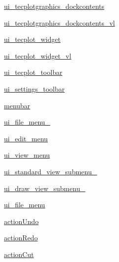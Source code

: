 \begin{DoxyCompactItemize}
\item 
\hyperlink{classoutput__viewer_u_i_1_1_ui___main_window_a833a8408dc99f9eedbb331e8e360bdf5}{ui\+\_\+tecplotgraphics\+\_\+dockcontents}
\item 
\hyperlink{classoutput__viewer_u_i_1_1_ui___main_window_a9937dfdabe6438f3bfec3ba0c6976557}{ui\+\_\+tecplotgraphics\+\_\+dockcontents\+\_\+vl}
\item 
\hyperlink{classoutput__viewer_u_i_1_1_ui___main_window_a7e3ee3296fa5786336d90635c2442045}{ui\+\_\+tecplot\+\_\+widget}
\item 
\hyperlink{classoutput__viewer_u_i_1_1_ui___main_window_a617fa074367d63edd758567a5d67b398}{ui\+\_\+tecplot\+\_\+widget\+\_\+vl}
\item 
\hyperlink{classoutput__viewer_u_i_1_1_ui___main_window_afbd7bdb7c0f0d9d24bad52a80454d101}{ui\+\_\+tecplot\+\_\+toolbar}
\item 
\hyperlink{classoutput__viewer_u_i_1_1_ui___main_window_a34720910fa97b9e65de72cbee6a12803}{ui\+\_\+settings\+\_\+toolbar}
\item 
\hyperlink{classoutput__viewer_u_i_1_1_ui___main_window_a265e28ccad6c1cd4a94a22965fe6c536}{menubar}
\item 
\hyperlink{classoutput__viewer_u_i_1_1_ui___main_window_ad42c5a1028285e160bfb9eb048cd245b}{ui\+\_\+file\+\_\+menu\+\_\+}
\item 
\hyperlink{classoutput__viewer_u_i_1_1_ui___main_window_a791ff2e9d4693638b8e5220f53f1b8d2}{ui\+\_\+edit\+\_\+menu}
\item 
\hyperlink{classoutput__viewer_u_i_1_1_ui___main_window_aaf13351c59caceedfc932c46217b4cda}{ui\+\_\+view\+\_\+menu}
\item 
\hyperlink{classoutput__viewer_u_i_1_1_ui___main_window_a6d61f7e62a75570f3cbb6b5c9553081b}{ui\+\_\+standard\+\_\+view\+\_\+submenu\+\_\+}
\item 
\hyperlink{classoutput__viewer_u_i_1_1_ui___main_window_a5c5ae1d1afe30f77e2be3526c82acd05}{ui\+\_\+draw\+\_\+view\+\_\+submenu\+\_\+}
\item 
\hyperlink{classoutput__viewer_u_i_1_1_ui___main_window_abf378391cb97c7daa1dcc7458ae26d29}{ui\+\_\+file\+\_\+menu}
\item 
\hyperlink{classoutput__viewer_u_i_1_1_ui___main_window_a885e2a1ee5a96a1e7c1a336ecdd02518}{action\+Undo}
\item 
\hyperlink{classoutput__viewer_u_i_1_1_ui___main_window_a732cf29558af5ac0db109050e93d03a0}{action\+Redo}
\item 
\hyperlink{classoutput__viewer_u_i_1_1_ui___main_window_a20b08adb5b2b3e4f97465cfbdd5c4d27}{action\+Cut}

\end{DoxyCompactItemize}
